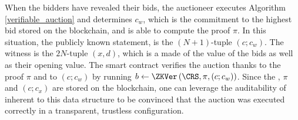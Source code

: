	When the bidders have revealed their bids, the auctioneer executes Algorithm \ref{verifiable_auction} and determines $c_w$, which is the commitment to the highest bid stored on the blockchain, and is able to compute the proof $\pi$. In this situation, the publicly known statement, is the $(N+1)$-tuple $(c; c_w)$. The witness is the $2N$-tuple $(x, d)$, which is a made of the value of the bids as well as their opening value. The smart contract verifies the auction thanks to the proof $\pi$ and to $(c; c_w)$ by running $b \gets \ZKVer\left(\CRS, \pi, (c; c_w)\right)$. Since the \CRS, $\pi$ and $(c;c_x)$ are stored on the blockchain, one can leverage the auditability of inherent to this data structure to be convinced that the auction was executed correctly in a transparent, trustless configuration.


